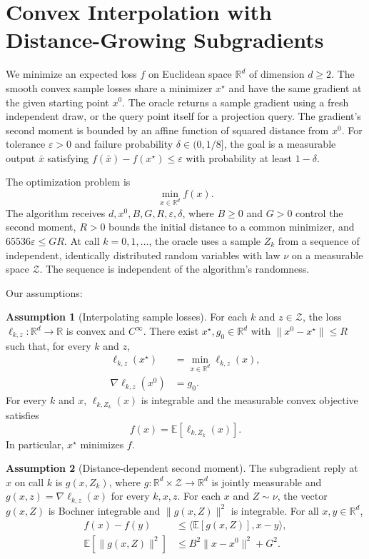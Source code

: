 \documentclass[10pt]{article}
\theoremstyle{definition}
\newtheorem{assumption}{Assumption}
\begin{document}
\section*{Convex Interpolation with Distance-Growing Subgradients}
We minimize an expected loss $f$ on Euclidean space $\mathbb{R}^d$ of dimension $d\geq 2$. The smooth convex sample losses share a minimizer $x^\star$ and have the same gradient at the given starting point $x^0$. The oracle returns a sample gradient using a fresh independent draw, or the query point itself for a projection query. The gradient's second moment is bounded by an affine function of squared distance from $x^0$. For tolerance $\varepsilon>0$ and failure probability $\delta\in(0,1/8]$, the goal is a measurable output $\bar{x}$ satisfying $f(\bar{x})-f(x^\star)\leq\varepsilon$ with probability at least $1-\delta$.

The optimization problem is
\[
\min_{x\in\mathbb{R}^d} f(x).
\]
The algorithm receives $d,x^0,B,G,R,\varepsilon,\delta$, where $B\geq 0$ and $G>0$ control the second moment, $R>0$ bounds the initial distance to a common minimizer, and $65536\varepsilon\leq GR$. At call $k=0,1,\ldots$, the oracle uses a sample $Z_k$ from a sequence of independent, identically distributed random variables with law $\nu$ on a measurable space $\mathcal{Z}$. The sequence is independent of the algorithm's randomness.

Our assumptions:
\begin{assumption}[Interpolating sample losses]
For each $k$ and $z\in\mathcal{Z}$, the loss $\ell_{k,z}:\mathbb{R}^d\to\mathbb{R}$ is convex and $C^\infty$. There exist $x^\star,g_0\in\mathbb{R}^d$ with $\|x^0-x^\star\|\leq R$ such that, for every $k$ and $z$,
\[
\begin{aligned}
\ell_{k,z}(x^\star)&=\min_{x\in\mathbb{R}^d}\ell_{k,z}(x),\\
\nabla\ell_{k,z}(x^0)&=g_0.
\end{aligned}
\]
For every $k$ and $x$, $\ell_{k,Z_k}(x)$ is integrable and the measurable convex objective satisfies
\[
f(x)=\mathbb{E}[\ell_{k,Z_k}(x)].
\]
In particular, $x^\star$ minimizes $f$.
\end{assumption}

\begin{assumption}[Distance-dependent second moment]
The subgradient reply at $x$ on call $k$ is $g(x,Z_k)$, where $g:\mathbb{R}^d\times\mathcal{Z}\to\mathbb{R}^d$ is jointly measurable and $g(x,z)=\nabla\ell_{k,z}(x)$ for every $k,x,z$. For each $x$ and $Z\sim\nu$, the vector $g(x,Z)$ is Bochner integrable and $\|g(x,Z)\|^2$ is integrable. For all $x,y\in\mathbb{R}^d$,
\[
\begin{aligned}
f(x)-f(y)&\leq\langle\mathbb{E}[g(x,Z)],x-y\rangle,\\
\mathbb{E}[\|g(x,Z)\|^2]&\leq B^2\|x-x^0\|^2+G^2.
\end{aligned}
\]
\end{assumption}
\end{document}
